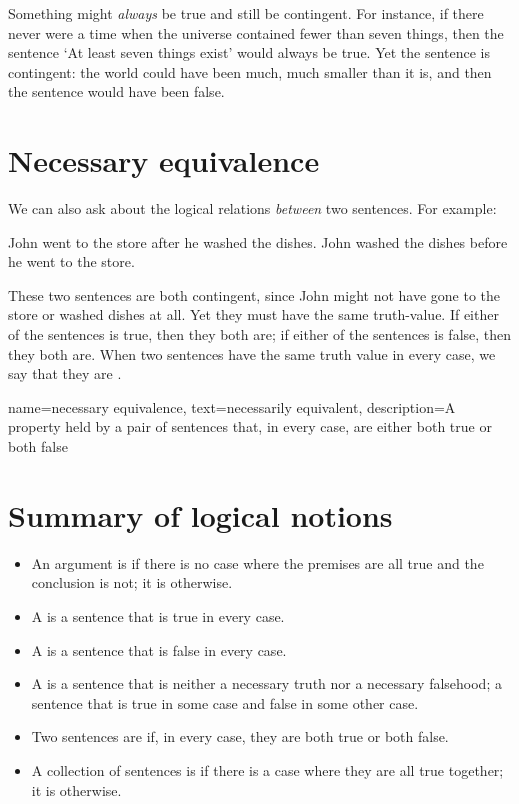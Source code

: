 Something might \emph{always} be true and still be contingent. For instance, if there never were a time when the universe contained fewer than seven things, then the sentence `At least seven things exist' would always be true. Yet the sentence is contingent: the world could have been much, much smaller than it is, and then the sentence would have been false.

\section{Necessary equivalence}

We can also ask about the logical relations \emph{between} two sentences. For example:
\begin{earg}
\prem John went to the store after he washed the dishes.
\prem John washed the dishes before he went to the store.
\end{earg}
These two sentences are both contingent, since John might not have gone to the store or washed dishes at all. Yet they must have the same truth-value. If either of the sentences is true, then they both are; if either of the sentences is false, then they both are. When two sentences have the same truth value in every case, we say that they are .

{
name={necessary equivalence},
text={necessarily equivalent},
description={A property held by a pair of sentences that, in every case, are either both true or both false}
}


\section*{Summary of logical notions}
\begin{highlighted}
\begin{itemize}
\item An argument is  if there is no case where the premises are all true and the conclusion is not; it is  otherwise.

\item A  is a sentence that is true in every case.

\item A  is a sentence that is false in every case.

\item A  is a sentence that is neither a necessary truth nor a necessary falsehood; a sentence that is true in some case and false in some other case.

\item Two sentences are  if, in every case, they are both true or both false.

\item A collection of sentences is  if there is a case where they are all true together; it is  otherwise.
\end{itemize}
\end{highlighted}

